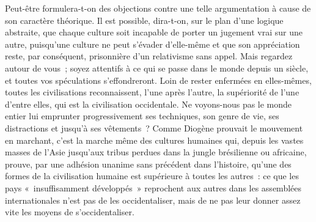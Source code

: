 \documentclass[french,twoside]{book} %
\begin{document}
\noindent Peut-être formulera-t-on des objections contre une telle argumentation à cause de son caractère théorique. Il est possible, dira-t-on, sur le plan d’une logique abstraite, que chaque culture soit incapable de porter un jugement vrai sur une autre, puisqu’une culture ne peut s’évader d’elle-même et que son appréciation reste, par conséquent, prisonnière d’un relativisme sans appel. Mais regardez autour de vous ; soyez attentifs à ce qui se passe dans le monde depuis un siècle, et toutes vos spéculations s’effondreront. Loin de rester enfermées en elles-mêmes, toutes les civilisations reconnaissent, l’une après l’autre, la supériorité de l’une d’entre elles, qui est la civilisation occidentale. Ne voyons-nous pas le monde entier lui emprunter progressivement ses techniques, son genre de vie, ses distractions et jusqu’à ses vêtements ? Comme Diogène prouvait le mouvement en marchant, c’est la marche même des cultures humaines qui, depuis les vastes masses de l’Asie jusqu’aux tribus perdues dans la jungle brésilienne ou africaine, prouve, par une adhésion unanime sans précédent dans l’histoire, qu’une des formes de la civilisation humaine est supérieure à toutes les autres : ce que les pays « insuffisamment développés » reprochent aux autres dans les assemblées internationales n’est pas de les occidentaliser, mais de ne pas leur donner assez vite les moyens de s’occidentaliser.\par
\end{document}
